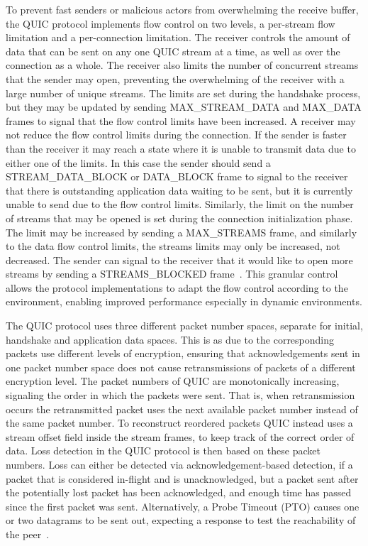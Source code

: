 \documentclass[english, 12pt, a4paper, elec, utf8, a-2b, online]{aaltothesis}
\begin{document}
To prevent fast senders or malicious actors from overwhelming the receive buffer,
the QUIC protocol implements flow control on two levels, a per-stream flow limitation
and a per-connection limitation. The receiver controls the amount of data that can
be sent on any one QUIC stream at a time, as well as over the connection as a whole.
The receiver also limits the number of concurrent streams that the sender may open,
preventing the overwhelming of the receiver with a large number of unique streams.
The limits are set during the handshake process, but they may be updated by sending
MAX\_STREAM\_DATA and MAX\_DATA frames to signal that the flow control limits have
been increased. A receiver may not reduce the flow control limits during the connection.
If the sender is faster than the receiver it may reach a state where it is unable
to transmit data due to either one of the limits. In this case the sender should
send a STREAM\_DATA\_BLOCK or DATA\_BLOCK frame to signal to the receiver that
there is outstanding application data waiting to be sent, but it is currently unable to send
due to the flow control limits. Similarly, the limit on the number of streams that
may be opened is set during the connection initialization phase. The limit may be
increased by sending a MAX\_STREAMS frame, and similarly to the data flow control limits,
the streams limits may only be increased, not decreased. The sender can signal to the
receiver that it would like to open more streams by sending a STREAMS\_BLOCKED frame~\cite{rfc9000}.
This granular control allows the protocol implementations to adapt the flow control
according to the environment, enabling improved performance especially in dynamic environments.

The QUIC protocol uses three different packet number spaces, separate for initial,
handshake and application data spaces. This is as due to the
corresponding packets use different levels of encryption, ensuring that acknowledgements
sent in one packet number space does not cause retransmissions of packets of a different
encryption level. The packet numbers of QUIC are monotonically increasing, signaling
the order in which the packets were sent. That is, when retransmission occurs the
retransmitted packet uses the next available packet number instead of the same packet number.
To reconstruct reordered packets QUIC instead
uses a stream offset field inside the stream frames, to keep track of the correct
order of data. Loss detection in the QUIC protocol is then based on these packet
numbers. Loss can either be detected via acknowledgement-based detection,
if a packet that is considered in-flight and is unacknowledged, but a packet
sent after the potentially lost packet has been acknowledged, and enough time has passed
since the first packet was sent. Alternatively, a Probe Timeout (PTO) causes one or two
datagrams to be sent out, expecting a response to test the reachability of the peer~\cite{rfc9002}.
\end{document}
